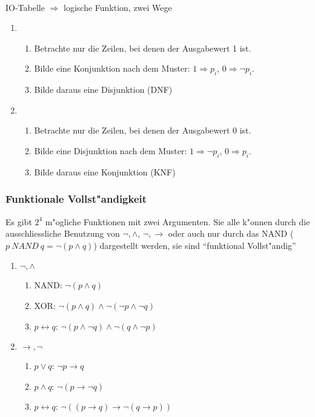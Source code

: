 \documentclass[11pt, a4paper,twocolumn]{scrartcl}
\begin{document}
\paragraph{}
 IO-Tabelle $\Rightarrow$ logische Funktion, zwei Wege
 \begin{enumerate}
 \item 
  \begin{enumerate}
   \item Betrachte nur die Zeilen, bei denen der Ausgabewert 1 ist.
   \item Bilde eine Konjunktion nach dem Muster: $1 \Rightarrow p_i$, $0 \Rightarrow \lnot p_i$.
   \item Bilde daraus eine Disjunktion (DNF)
  \end{enumerate}
 \item
  \begin{enumerate}
   \item Betrachte nur die Zeilen, bei denen der Ausgabewert 0 ist.
   \item Bilde eine Disjunktion nach dem Muster: $1 \Rightarrow \lnot p_i$, $0 \Rightarrow p_i$.
   \item Bilde daraus eine Konjunktion (KNF)
  \end{enumerate}
 \end{enumerate}

\subsubsection{Funktionale Vollst"andigkeit}
Es gibt $2^4$ m"ogliche Funktionen mit zwei Argumenten. Sie alle k"onnen durch die ausschliessliche Benutzung von $\lnot, \land$, $\lnot, \rightarrow$ oder auch nur durch das NAND ($p\ NAND\ q = \lnot(p \land q)$) dargestellt werden, sie sind ``funktional Vollst"andig''
\begin{enumerate}
 \item $\mathit{\lnot, \land}$
  \begin{enumerate}
   \item NAND: $\lnot(p\land q)$
   \item XOR: $\lnot(p\land q)\land\lnot(\lnot p\land \lnot q)$
   \item $p\leftrightarrow q$: $\lnot(p\land \lnot q)\land \lnot(q\land \lnot p)$
  \end{enumerate}
 \item $\mathit{\rightarrow, \lnot}$
  \begin{enumerate}
   \item $p\lor q$: $\lnot p\rightarrow q$
   \item $p\land q$: $\lnot(p\rightarrow\lnot q)$
   \item $p\leftrightarrow q$: $\lnot((p\rightarrow q)\rightarrow \lnot(q\rightarrow p))$
  \end{enumerate}
\end{enumerate}
\end{document}
